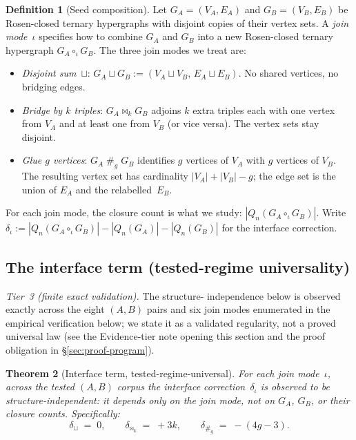 \documentclass[12pt,a4paper]{article}
\newtheorem{theorem}{Theorem}[section]
\theoremstyle{definition}
\newtheorem{definition}[theorem]{Definition}
\theoremstyle{remark}
\newcommand{\Qn}{Q_n}
\newcommand{\bridge}{\mathbin{\bowtie}}     %
\newcommand{\glue}{\mathbin{\#}}            %
\begin{document}
\begin{definition}[Seed composition]\label{def:composition}
Let $G_A = (V_A, E_A)$ and $G_B = (V_B, E_B)$ be Rosen-closed
ternary hypergraphs with disjoint copies of their vertex sets. A
\emph{join mode}~$\iota$ specifies how to combine $G_A$ and $G_B$
into a new Rosen-closed ternary hypergraph $G_A \circ_\iota G_B$.
The three join modes we treat are:
\begin{itemize}[leftmargin=2em,topsep=2pt,itemsep=2pt]
\item \emph{Disjoint sum}~$\sqcup$: $G_A \sqcup G_B := (V_A \sqcup
V_B, \, E_A \sqcup E_B)$. No shared vertices, no bridging edges.
\item \emph{Bridge by $k$ triples}: $G_A \bridge_k G_B$ adjoins
$k$ extra triples each with one vertex from $V_A$ and at least one
from $V_B$ (or vice versa). The vertex sets stay disjoint.
\item \emph{Glue $g$ vertices}: $G_A \glue_g G_B$ identifies $g$
vertices of $V_A$ with $g$ vertices of $V_B$. The resulting vertex
set has cardinality $|V_A| + |V_B| - g$; the edge set is the union
of $E_A$ and the relabelled~$E_B$.
\end{itemize}
\end{definition}

For each join mode, the closure count is what we study:
$|\Qn(G_A \circ_\iota G_B)|$. Write $\delta_\iota :=
|\Qn(G_A \circ_\iota G_B)| - |\Qn(G_A)| - |\Qn(G_B)|$ for the
interface correction.

\subsection{The interface term (tested-regime universality)}\label{sec:comp-delta}

\noindent\emph{Tier~3 (finite exact validation).} The structure-
independence below is observed exactly across the eight $(A, B)$ pairs
and six join modes enumerated in the empirical verification below; we
state it as a
validated regularity, not a proved universal law (see the Evidence-tier
note opening this section and the proof obligation in
\S\ref{sec:proof-program}).

\begin{theorem}[Interface term, tested-regime-universal]\label{thm:universal-delta}
For each join mode~$\iota$, across the tested $(A, B)$ corpus the
interface correction~$\delta_\iota$ is observed to be
\emph{structure-independent}: it depends only on the join mode, not on
$G_A$, $G_B$, or their closure counts.
Specifically:
\begin{equation}\label{eq:delta-laws}
\delta_{\sqcup} \;=\; 0, \qquad
\delta_{\bridge_k} \;=\; +3k, \qquad
\delta_{\glue_g} \;=\; -(4g - 3).
\end{equation}
\end{theorem}
\end{document}

